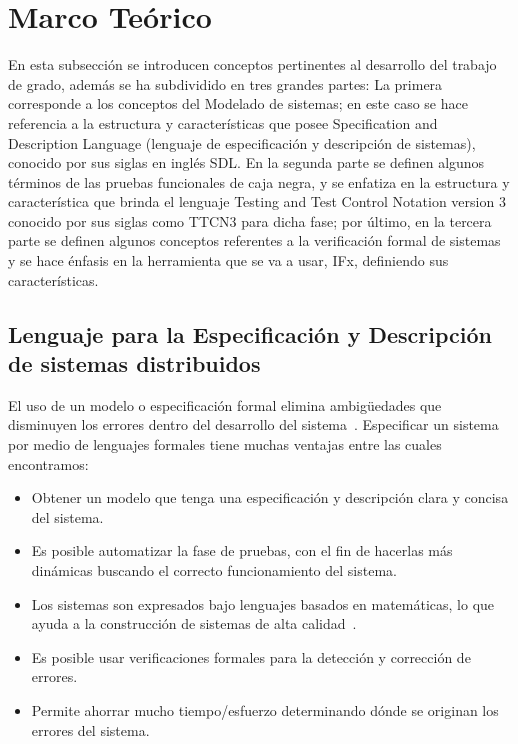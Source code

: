 
\section{Marco Te\'orico}

En esta subsecci\'on se introducen conceptos pertinentes al desarrollo del 
trabajo de grado, adem\'as se ha subdividido en tres grandes partes: La primera 
corresponde a los conceptos del Modelado de sistemas; en este caso se hace 
referencia a la estructura y caracter\'isticas que posee Specification and 
Description Language (lenguaje de especificaci\'on y descripci\'on de sistemas), 
conocido por sus siglas en ingl\'es SDL. En la segunda parte se definen algunos 
t\'erminos de las pruebas funcionales de caja negra, y se enfatiza en la 
estructura y caracter\'istica que brinda el lenguaje Testing and Test Control 
Notation version 3 conocido por sus siglas como TTCN3 para dicha fase; por 
\'ultimo, en la tercera parte se definen algunos conceptos referentes a la 
verificaci\'on formal de sistemas y se hace \'enfasis en la herramienta que se 
va a usar, IFx, definiendo sus caracter\'isticas.

\subsection{Lenguaje para la Especificaci\'on y Descripci\'on de sistemas 
distribuidos}

El uso de un modelo o especificaci\'on formal elimina ambig\"uedades que 
disminuyen los errores dentro del desarrollo del sistema~\cite{Hierons2009}. 
Especificar un sistema por medio de lenguajes formales tiene muchas ventajas 
entre las cuales encontramos: 

\begin{itemize}
 \item Obtener un modelo que tenga una especificaci\'on y descripci\'on clara y 
concisa del sistema.
\item Es posible automatizar la fase de pruebas, con el fin de hacerlas m\'as 
din\'amicas buscando el correcto funcionamiento del sistema.
\item Los sistemas son expresados bajo lenguajes basados en matem\'aticas, lo 
que ayuda a la construcci\'on de sistemas de alta calidad~\cite{Hierons2009}.
\item Es posible usar verificaciones formales para la detecci\'on y 
correcci\'on de errores.
\item Permite ahorrar mucho tiempo/esfuerzo determinando d\'onde se originan 
los errores del sistema.
\end{itemize}

